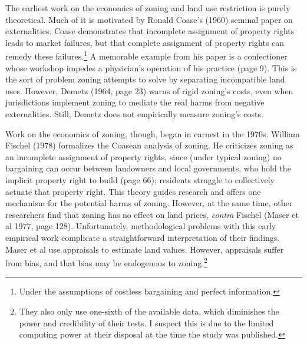 \documentclass[11pt]{article}
\begin{document}
The earliest work on the economics of zoning and land use restriction is purely theoretical. Much of it is motivated by Ronald Coase’s (1960) seminal paper on externalities. Coase demonstrates that incomplete assignment of property rights leads to market failures, but that complete assignment of property rights can remedy these failures.\footnote{Under the assumptions of costless bargaining and perfect information.} A memorable example from his paper is a confectioner whose workshop impedes a physician’s operation of his practice (page 9). This is the sort of problem zoning attempts to solve by separating incompatible land uses. However, Demetz (1964, page 23) warns of  rigid zoning’s costs, even when jurisdictions implement zoning to mediate the real harms from negative externalities. Still, Demetz does not empirically measure zoning’s costs.

Work on the economics of zoning, though, began in earnest in the 1970s. William Fischel (1978) formalizes the Coasean analysis of zoning. He criticizes zoning as an incomplete assignment of property rights, since (under typical zoning) no bargaining can occur between landowners and local governments, who hold the implicit property right to build (page 66); residents struggle to collectively actuate that property right. This theory guides research and offers one mechanism for the potential harms of zoning. However, at the same time, other researchers find that zoning has no effect on land prices, \textit{contra} Fischel (Maser et al 1977, page 128). Unfortunately, methodological problems with this early empirical work complicate a straightforward interpretation of their findings. Maser et al use appraisals to estimate land values. However, appraisals suffer from bias, and that bias may be endogenous to zoning.\footnote{They also only use one-sixth of the available data, which diminishes the power and credibility of their tests. I suspect this is due to the limited computing power at their disposal at the time the study was published.}
\end{document}
